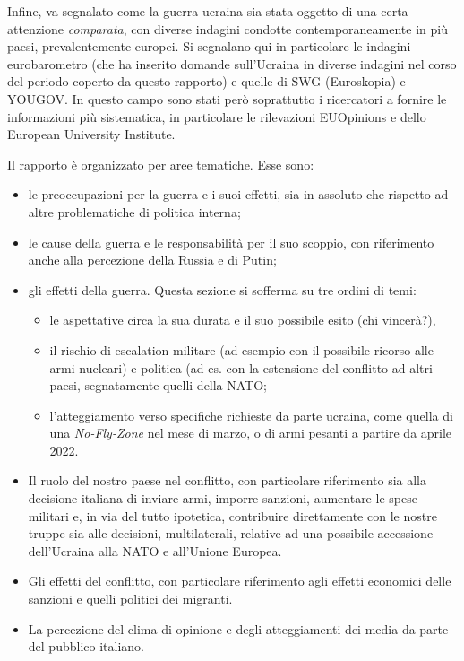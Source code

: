 \documentclass[
  openany]{book}
\providecommand{\tightlist}{%
  \setlength{\itemsep}{0pt}\setlength{\parskip}{0pt}}
\begin{document}
Infine, va segnalato come la guerra ucraina sia stata oggetto di una certa attenzione \emph{comparata}, con diverse indagini condotte contemporaneamente in più paesi, prevalentemente europei. Si segnalano qui in particolare le indagini eurobarometro (che ha inserito domande sull'Ucraina in diverse indagini nel corso del periodo coperto da questo rapporto) e quelle di SWG (Euroskopia) e YOUGOV. In questo campo sono stati però soprattutto i ricercatori a fornire le informazioni più sistematica, in particolare le rilevazioni EUOpinions e dello European University Institute.

Il rapporto è organizzato per aree tematiche. Esse sono:

\begin{itemize}
\item
  le preoccupazioni per la guerra e i suoi effetti, sia in assoluto che rispetto ad altre problematiche di politica interna;
\item
  le cause della guerra e le responsabilità per il suo scoppio, con riferimento anche alla percezione della Russia e di Putin;
\item
  gli effetti della guerra. Questa sezione si sofferma su tre ordini di temi:

  \begin{itemize}
  \tightlist
  \item
    le aspettative circa la sua durata e il suo possibile esito (chi vincerà?),
  \item
    il rischio di escalation militare (ad esempio con il possibile ricorso alle armi nucleari) e politica (ad es. con la estensione del conflitto ad altri paesi, segnatamente quelli della NATO;
  \item
    l'atteggiamento verso specifiche richieste da parte ucraina, come quella di una \emph{No-Fly-Zone} nel mese di marzo, o di armi pesanti a partire da aprile 2022.
  \end{itemize}
\item
  Il ruolo del nostro paese nel conflitto, con particolare riferimento sia alla decisione italiana di inviare armi, imporre sanzioni, aumentare le spese militari e, in via del tutto ipotetica, contribuire direttamente con le nostre truppe sia alle decisioni, multilaterali, relative ad una possibile accessione dell'Ucraina alla NATO e all'Unione Europea.
\item
  Gli effetti del conflitto, con particolare riferimento agli effetti economici delle sanzioni e quelli politici dei migranti.
\item
  La percezione del clima di opinione e degli atteggiamenti dei media da parte del pubblico italiano.
\end{itemize}
\end{document}
